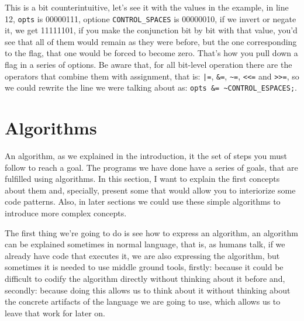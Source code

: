 \documentclass[a4paper]{article}
\begin{document}
This is a bit counterintuitive, let's see it with the values in the example, in
line 12, \verb!opts! is 00000111, optione \verb!CONTROL_SPACES! is 00000010, if
we invert or negate it, we get 11111101, if you make the conjunction bit by bit
with that value, you'd see that all of them would remain as they were before,
but the one corresponding to the flag, that one would be forced to become zero.
That's how you pull down a flag in a series of options. Be aware that, for all
bit-level operation there are the operators that combine them with assignment,
that is: \verb!|=!, \verb!&=!, \verb!~=!, \verb!<<=! and \verb!>>=!, so we could
rewrite the line we were talking about as:
\lstinline[style=C]!opts &= ~CONTROL_ESPACES;!.

\section{Algorithms}
An algorithm, as we explained in the introduction, it the set of steps you must
follow to reach a goal. The programs we have done have a series of goals, that
are fulfilled using algorithms. In this section, I want to explain the first
concepts about them and, specially, present some that would allow you to
interiorize some code patterns. Also, in later sections we could use these
simple algorithms to introduce more complex concepts.

The first thing we're going to do is see how to express an algorithm, an
algorithm can be explained sometimes in normal language, that is, as humans
talk, if we already have code that executes it, we are also expressing the
algorithm, but sometimes it is needed to use middle ground tools, firstly:
because it could be difficult to codify the algorithm directly without thinking
about it before and, secondly: because doing this allows us to think about it
without thinking about the concrete artifacts of the language we are going to
use, which allows us to leave that work for later on.

\end{document}
